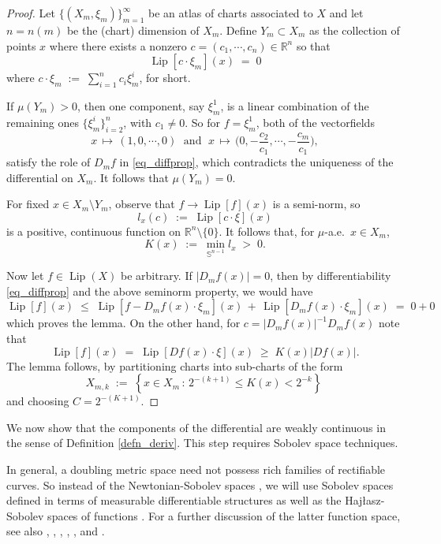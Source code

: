 \documentclass[reqno]{amsart}
\theoremstyle{plain}
\theoremstyle{definition}
\theoremstyle{remark}
\numberwithin{equation}{section}
\newcommand{\Lip}{\operatorname{Lip}}
\newcommand{\R}{\mathbb{R}}
\begin{document}
\begin{proof}
Let $\{(X_m,\xi_m)\}_{m=1}^\infty$ be an atlas of charts associated to %
$X$ and let $n = n(m)$ be the (chart) dimension of $X_m$.  Define $Y_m \subset X_m$ as the collection of points $x$ where there exists a nonzero $c = (c_1, \cdots, c_n) \in \R^n$ so that 
$$
\Lip[ c \cdot \xi_m ](x) \;=\; 0
$$
where $c \cdot \xi_m \;:=\; \sum_{i=1}^n c_i\xi_m^i$, for short.

If $\mu(Y_m) > 0$, then one component, say $\xi_m^1$, is a linear combination of the remaining ones $\{\xi_m^i\}_{i=2}^n$, with $c_1 \neq 0$.  So for $f = \xi_m^1$, both of the vectorfields
$$
x \,\mapsto\, (1, 0, \cdots, 0) \; \text{ and } \; 
x \,\mapsto\, \Big(0, -\frac{c_2}{c_1}, \cdots, -\frac{c_m}{c_1}\Big),
$$
satisfy the role of $D_mf$ in \eqref{eq_diffprop}, which contradicts the uniqueness of the differential on $X_m$.  It follows that $\mu(Y_m) = 0$.

For fixed $x \in X_m \setminus Y_m$, observe that $f \to \Lip[f](x)$ is a semi-norm, so 
$$
l_x(c) \;:=\; \Lip[c \cdot \xi](x)
$$
is a positive, continuous function on $\R^n \setminus \{0\}$.  It follows that, for $\mu$-a.e.\ $x \in X_m$,
$$
K(x) \;:=\; \min_{\mathbb{S}^{n-1}} l_x \;>\; 0.
$$

Now let $f \in \Lip(X)$ be arbitrary.  If $|D_mf(x)| = 0$, then by differentiability \eqref{eq_diffprop} and the above seminorm property, we would have
$$
\Lip[f](x) \;\leq\;
\Lip[f - D_mf(x) \cdot \xi_m](x) \,+\, \Lip[ D_mf(x) \cdot \xi_m](x) \;=\; 0 + 0
$$ 
which proves the lemma.  On the other hand, for $c = |D_mf(x)|^{-1}D_mf(x)$ note that
$$
\Lip[f](x) \;=\; 
\Lip[ Df(x) \cdot \xi ](x) \;\geq\;
K(x) |Df(x)|.
$$
The lemma follows, by partitioning charts into sub-charts of the form
$$
X_{m,k} \;:=\; 
\left\{x \in X_m \,:\, 2^{-(k+1)} \leq  K(x) < 2^{-k} \right\}\
$$
and choosing $C = 2^{-(K+1)}$.
\end{proof}

We now show that the components of the differential %
are weakly continuous in the sense of Definition \ref{defn_deriv}.  This step requires Sobolev space techniques.

In general, a doubling metric space need not possess rich families of rectifiable curves.  So instead of the Newtonian-Sobolev spaces \cite{Shan}, we will use Sobolev spaces defined in terms of measurable differentiable structures as well as the Haj{\l}asz-Sobolev spaces of functions \cite{Hajlasz}. For a further discussion of the latter function space, see also \cite{Heinonen:Koskela}, \cite{Shan}, \cite{Hajlasz:Koskela2}, \cite{Hajlasz2}, \cite{HeinonenLA}, and \cite{HeinonenNC}.
\end{document}
